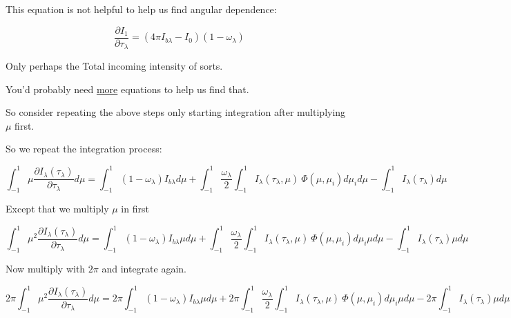 \documentclass[12pt]{article}
\renewcommand{\_}{\kern-1.5pt\textunderscore\kern-1.5pt}
\begin{document}
\begin{itemize}
This equation is not helpful to help us find angular dependence:\par

 \[ \frac{ \partial I_{1}}{ \partial  \tau_{ \lambda }}= \left( 4 \pi I_{b \lambda }-I_{0} \right)  \left( 1- \omega _{ \lambda } \right)  \] \par

Only perhaps the Total incoming intensity of sorts.\par

You’d probably need \uline{more} equations to help us find that.\par

So consider repeating the above steps only starting integration after multiplying  \(  \mu  \)  first.\par

So we repeat the integration process:\par

 \[  \int _{-1}^{1} \mu \frac{ \partial I_{ \lambda } \left(  \tau_{ \lambda } \right) }{ \partial  \tau_{ \lambda }}d \mu = \int _{-1}^{1} \left( 1- \omega _{ \lambda } \right) I_{b \lambda } d \mu + \int _{-1}^{1}\frac{ \omega _{ \lambda }}{2} \int _{-1}^{1}I_{ \lambda } \left(  \tau_{ \lambda }, \mu  \right) ~ \Phi  \left(  \mu , \mu _{i} \right) d \mu _{i}d \mu - \int _{-1}^{1}I_{ \lambda } \left(  \tau_{ \lambda } \right) d \mu  \] \par

Except that we multiply  \(  \mu  \)  in first\par

 \[  \int _{-1}^{1} \mu ^{2}\frac{ \partial I_{ \lambda } \left(  \tau_{ \lambda } \right) }{ \partial  \tau_{ \lambda }}d \mu = \int _{-1}^{1} \left( 1- \omega _{ \lambda } \right) I_{b \lambda } \mu  d \mu + \int _{-1}^{1}\frac{ \omega _{ \lambda }}{2} \int _{-1}^{1}I_{ \lambda } \left(  \tau_{ \lambda }, \mu  \right) ~ \Phi  \left(  \mu , \mu _{i} \right) d \mu _{i} \mu  d \mu - \int _{-1}^{1}I_{ \lambda } \left(  \tau_{ \lambda } \right)   \mu  d \mu  \] \par

Now multiply with  \( 2 \pi  \)  and integrate again.\par

 \[ 2 \pi  \int _{-1}^{1} \mu ^{2}\frac{ \partial I_{ \lambda } \left(  \tau_{ \lambda } \right) }{ \partial  \tau_{ \lambda }}d \mu =2 \pi  \int _{-1}^{1} \left( 1- \omega _{ \lambda } \right) I_{b \lambda } \mu  d \mu +2 \pi  \int _{-1}^{1}\frac{ \omega _{ \lambda }}{2} \int _{-1}^{1}I_{ \lambda } \left(  \tau_{ \lambda }, \mu  \right) ~ \Phi  \left(  \mu , \mu _{i} \right) d \mu _{i} \mu  d \mu -2 \pi  \int _{-1}^{1}I_{ \lambda } \left(  \tau_{ \lambda } \right)   \mu  d \mu  \] \par


\end{itemize}
\end{document}
